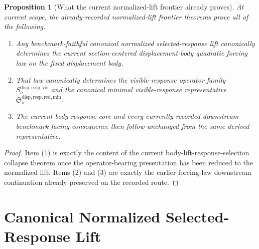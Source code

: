 \documentclass[11pt]{article}
\newcommand{\VisibleResponseOperator}[1]{S_{#1}^{\mathrm{disp,resp,vis}}}
\newcommand{\MinimalReducedStructure}{\mathfrak S^{\mathrm{disp,resp,red,min}}}
\newtheorem{proposition}{Proposition}
\begin{document}
\begin{proposition}[What the current normalized-lift frontier already proves]
\label{prop:frontier}
At current scope, the already-recorded normalized-lift frontier theorems prove all of the following.
\begin{enumerate}
    \item Any benchmark-faithful canonical normalized selected-response lift canonically determines the current section-centered displacement-body quadratic forcing law on the fixed displacement body.
    \item That law canonically determines the visible-response operator family \(\VisibleResponseOperator{\sigma}\) and the canonical minimal visible-response representative \(\MinimalReducedStructure_{\sigma}\).
    \item The current body-response core and every currently recorded downstream benchmark-facing consequence then follow unchanged from the same derived representative.
\end{enumerate}
\end{proposition}

\begin{proof}
Item (1) is exactly the content of the current body-lift-response-selection collapse theorem once the operator-bearing presentation has been reduced to the normalized lift. Items (2) and (3) are exactly the earlier forcing-law downstream continuation already preserved on the recorded route.
\end{proof}

\section{Canonical Normalized Selected-Response Lift}
\end{document}
